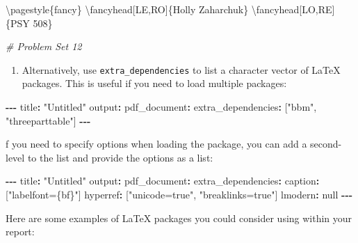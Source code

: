 \documentclass[
]{book}
\newenvironment{Shaded}{\begin{snugshade}}{\end{snugshade}}
\newcommand{\CommentTok}[1]{\textcolor[rgb]{0.56,0.35,0.01}{\textit{#1}}}
\newcommand{\DecValTok}[1]{\textcolor[rgb]{0.00,0.00,0.81}{#1}}
\newcommand{\NormalTok}[1]{#1}
\newcommand{\SpecialCharTok}[1]{\textcolor[rgb]{0.81,0.36,0.00}{\textbf{#1}}}
\newcommand{\StringTok}[1]{\textcolor[rgb]{0.31,0.60,0.02}{#1}}
\providecommand{\tightlist}{%
  \setlength{\itemsep}{0pt}\setlength{\parskip}{0pt}}
\begin{document}
\begin{itemize}
\begin{itemize}
\begin{Shaded}
\begin{Highlighting}[]
\NormalTok{\textbackslash{}pagestyle\{fancy\}}
\NormalTok{\textbackslash{}fancyhead[LE,RO]\{Holly Zaharchuk\}}
\NormalTok{\textbackslash{}fancyhead[LO,RE]\{PSY }\DecValTok{508}\NormalTok{\}}

\CommentTok{\# Problem Set 12}
\end{Highlighting}
\end{Shaded}

    \begin{enumerate}
    \def\labelenumi{\arabic{enumi}.}
    \setcounter{enumi}{1}
    \tightlist
    \item
      Alternatively, use \texttt{extra\_dependencies} to list a character vector of LaTeX packages. This is useful if you need to load multiple packages:
    \end{enumerate}

\begin{Shaded}
\begin{Highlighting}[]
\SpecialCharTok{{-}{-}{-}}
\NormalTok{title}\SpecialCharTok{:} \StringTok{"Untitled"}
\NormalTok{output}\SpecialCharTok{:} 
\NormalTok{  pdf\_document}\SpecialCharTok{:}
\NormalTok{    extra\_dependencies}\SpecialCharTok{:}\NormalTok{ [}\StringTok{"bbm"}\NormalTok{, }\StringTok{"threeparttable"}\NormalTok{]}
\SpecialCharTok{{-}{-}{-}}
\end{Highlighting}
\end{Shaded}

    f you need to specify options when loading the package, you can add a second-level to the list and provide the options as a list:

\begin{Shaded}
\begin{Highlighting}[]
\SpecialCharTok{{-}{-}{-}}
\NormalTok{title}\SpecialCharTok{:} \StringTok{"Untitled"}
\NormalTok{output}\SpecialCharTok{:} 
\NormalTok{  pdf\_document}\SpecialCharTok{:}
\NormalTok{    extra\_dependencies}\SpecialCharTok{:}
\NormalTok{      caption}\SpecialCharTok{:}\NormalTok{ [}\StringTok{"labelfont=\{bf\}"}\NormalTok{]}
\NormalTok{      hyperref}\SpecialCharTok{:}\NormalTok{ [}\StringTok{"unicode=true"}\NormalTok{, }\StringTok{"breaklinks=true"}\NormalTok{]}
\NormalTok{      lmodern}\SpecialCharTok{:}\NormalTok{ null}
\SpecialCharTok{{-}{-}{-}}
\end{Highlighting}
\end{Shaded}

    Here are some examples of LaTeX packages you could consider using within your report:


\end{itemize}
\end{itemize}
\end{document}
